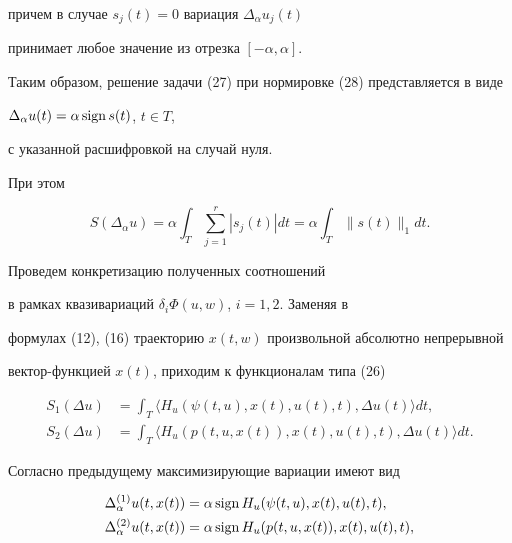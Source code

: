 причем в случае $s_{j}(t)=0$ вариация $\Delta_{\alpha} u_{j}(t)$


принимает любое значение из отрезка $[-\alpha, \alpha]$.





Таким образом, решение задачи (27) при нормировке (28) представляется в виде


$\Delta_{\alpha} u(t)=\alpha\operatorname{sign} s(t)$, $t\in T$,


с указанной расшифровкой на случай нуля.


При этом


$$


S(\Delta_{\alpha} u)=\alpha \int_{T} \sum_{j=1}^{r} | s_{j}(t)| dt=


\alpha \int_{T} \| s(t)\|_{1} dt.


$$





Проведем конкретизацию полученных соотношений 


в рамках квазивариаций $ \delta_{i} \Phi(u,w)$, $i=1,2$. Заменяя в


формулах (12), (16) траекторию $ x(t,w)$ произвольной абсолютно непрерывной 


вектор-функцией $x(t)$, приходим к функционалам типа (26)


\begin{align*}


S_{1}(\Delta u)&=\int_{T} \langle H_{u}(\psi(t,u), x(t), u(t), t),


\Delta u(t) \rangle dt,\\


S_{2}(\Delta u)&=\int_{T} \langle H_{u}(p(t,u,x(t)), x(t), u(t), t),


\Delta u(t) \rangle dt.


\end{align*}





Согласно предыдущему максимизирующие вариации имеют вид


\begin{align*}


\Delta_{\alpha}^{(1)} u(t, x(t))&=\alpha \sign 


H_{u}(\psi(t,u), x(t), u(t), t),\\


\Delta_{\alpha}^{(2)} u(t, x(t))&=\alpha \sign


H_{u}(p(t,u,x(t)), x(t), u(t), t),


\end{align*}


